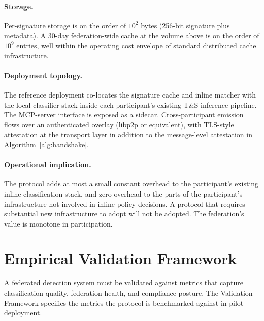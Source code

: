 \documentclass[11pt]{article}
\begin{document}
\paragraph{Storage.} Per-signature storage is on the order of $10^2$ bytes (256-bit signature plus metadata). A 30-day federation-wide cache at the volume above is on the order of $10^9$ entries, well within the operating cost envelope of standard distributed cache infrastructure.

\paragraph{Deployment topology.} The reference deployment co-locates the signature cache and inline matcher with the local classifier stack inside each participant's existing T\&S inference pipeline. The MCP-server interface is exposed as a sidecar. Cross-participant emission flows over an authenticated overlay (libp2p or equivalent), with TLS-style attestation at the transport layer in addition to the message-level attestation in Algorithm~\ref{alg:handshake}.

\paragraph{Operational implication.} The protocol adds at most a small constant overhead to the participant's existing inline classification stack, and zero overhead to the parts of the participant's infrastructure not involved in inline policy decisions. A protocol that requires substantial new infrastructure to adopt will not be adopted. The federation's value is monotone in participation.

\section{Empirical Validation Framework}
\label{sec:eval}

A federated detection system must be validated against metrics that capture classification quality, federation health, and compliance posture. The Validation Framework specifies the metrics the protocol is benchmarked against in pilot deployment.
\end{document}
